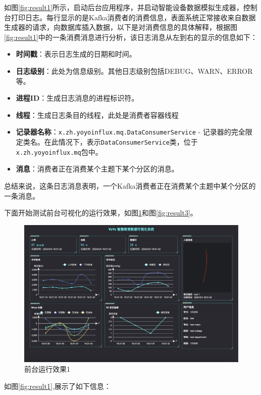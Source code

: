 \documentclass[oneside]{xduugthesis}
\begin{document}
如图\ref{fig:result1}所示，启动后台应用程序，并启动智能设备数据模拟生成器，控制台打印日志。每行显示的是Kafka消费者的消费信息，表面系统正常接收来自数据生成器的请求，向数据库插入数据，以下是对消费信息的具体解释，根据图\ref{fig:result1}中的一条消费消息进行分析，该日志消息从左到右的显示的信息如下：

\begin{itemize}[nosep]
    \item \textbf{时间戳}：表示日志生成的日期和时间。
    \item \textbf{日志级别}：此处为信息级别。其他日志级别包括DEBUG、WARN、ERROR等。
    \item \textbf{进程ID}：生成日志消息的进程标识符。
    \item \textbf{线程}：生成日志条目的线程，此处是消费者容器线程
    \item \textbf{记录器名称}：\texttt{x.zh.yoyoinflux.mq.DataConsumerService} - 记录器的完全限定类名。在此情况下，表示\texttt{DataConsumerService}类，位于\texttt{x.zh.yoyoinflux.mq}包中。
    \item \textbf{消息}：消费者正在消费某个主题下某个分区的消息。
\end{itemize}

总结来说，这条日志消息表明，一个Kafka消费者正在消费某个主题中某个分区的一条消息。

下面开始测试前台可视化的运行效果，如图\ref{fig:result2}和图\ref{fig:result3}。

\begin{figure}[htb]
    \centering
    \includegraphics[width=0.9\linewidth]{images/result2.png}
    \caption{前台运行效果1}
    \label{fig:result2}
\end{figure}

如图\ref{fig:result1},展示了如下信息：
\end{document}
